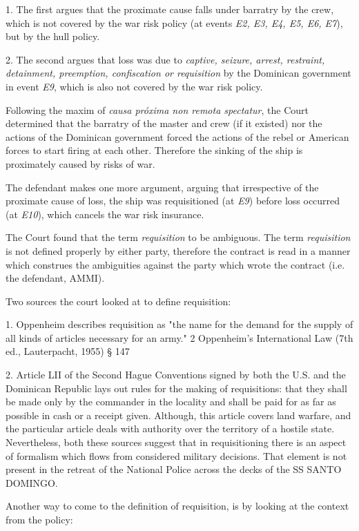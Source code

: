     1. The first argues that the proximate cause falls under barratry by the crew, which is not covered by the war risk policy (at events \textit{E2, E3, E4, E5, E6, E7}), but by the hull policy.
    
    2. The second argues that loss was due to \textit{captive, seizure, arrest, restraint, detainment, preemption, confiscation or requisition} by the Dominican government in event \textit{E9}, which is also not covered by the war risk policy.
    
    Following the maxim of \textit{causa próxima non remota spectatur}, the Court determined that the barratry of the master and crew (if it existed) nor the actions of the Dominican government forced the actions of the rebel or American forces to start firing at each other. Therefore the sinking of the ship is proximately caused by risks of war.
    
    The defendant makes one more argument, arguing that irrespective of the proximate cause of loss, the ship was requisitioned (at \textit{E9}) before loss occurred (at \textit{E10}), which cancels the war risk insurance.
            
    The Court found that the term \textit{requisition} to be ambiguous. The term \textit{requisition} is not defined properly by either party, therefore the contract is read in a manner which construes the ambiguities against the party which wrote the contract (i.e. the defendant, AMMI). 
    
    Two sources the court looked at to define requisition:
    
    1. Oppenheim describes requisition as "the name for the demand for the supply of all kinds of articles necessary for an army." 2 Oppenheim's International Law (7th ed., Lauterpacht, 1955) § 147
    
    2. Article LII of the Second Hague Conventions signed by both the U.S. and the Dominican Republic lays out rules for the making of requisitions: that they shall be made only by the commander in the locality and shall be paid for as far as possible in cash or a receipt given. Although, this article covers land warfare, and the particular article deals with authority over the territory of a hostile state. Nevertheless, both these sources suggest that in requisitioning there is an aspect of formalism which flows from considered military decisions. That element is not present in the retreat of the National Police across the decks of the SS SANTO DOMINGO.
     
     Another way to come to the definition of requisition, is by looking at the context from the policy:
     
